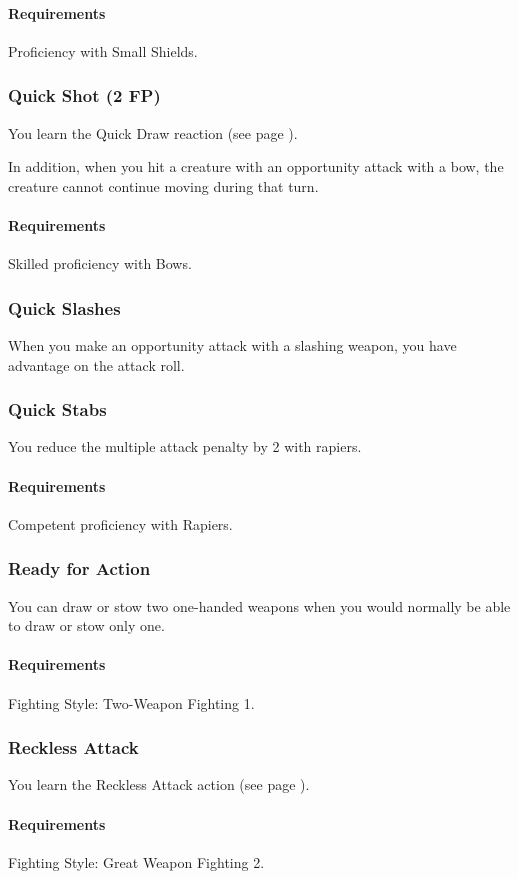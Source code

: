     \paragraph{Requirements} Proficiency with Small Shields.
\subsubsection{Quick Shot (2 FP)} \label{feat::quickshot}
    You learn the Quick Draw reaction (see page \pageref{act::quickdraw}).

    In addition, when you hit a creature with an opportunity attack with a bow, the creature cannot continue moving during that turn.
    \paragraph{Requirements} Skilled proficiency with Bows.
\subsubsection{Quick Slashes} \label{feat::quickslashes}
    When you make an opportunity attack with a slashing weapon, you have advantage on the attack roll.
\subsubsection{Quick Stabs} \label{feat::quickstabs}
    You reduce the multiple attack penalty by 2 with rapiers.
    \paragraph{Requirements} Competent proficiency with Rapiers.
\subsubsection{Ready for Action} \label{feat::readyforaction}
    You can draw or stow two one-handed weapons when you would normally be able to draw or stow only one.
    \paragraph{Requirements} Fighting Style: Two-Weapon Fighting 1.
\subsubsection{Reckless Attack} \label{feat::recklessattack}
    You learn the Reckless Attack action (see page \pageref{act::recklessattack}).
    \paragraph{Requirements} Fighting Style: Great Weapon Fighting 2.

